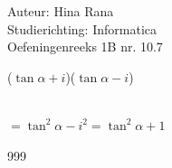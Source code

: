 \documentclass[a4paper]{article}
\begin{document}
\noindent \large Auteur: Hina Rana \\
\noindent \large Studierichting: Informatica\\
\noindent \large Oefeningenreeks 1B nr. 10.7\\

\medskip

\normalsize

($\tan\alpha + i$)($\tan\alpha - i$)\\                   \

$=\tan^2\alpha - i^2 = \tan^2\alpha + 1$


\begin{thebibliography}{999}
\end{thebibliography}
\end{document}
